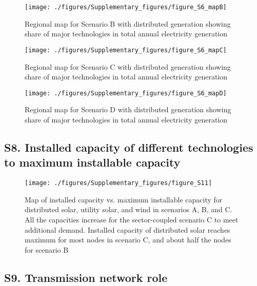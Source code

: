 \begin{figure}[H]
\renewcommand*{\thefigure}{S\arabic{figure}}

\texttt{[image: ./figures/Supplementary\_figures/figure\_S6\_mapB]}
\caption{Regional map for Scenario B with distributed generation showing share of major technologies in total annual electricity generation}
\end{figure}

\begin{figure}[H]
\renewcommand*{\thefigure}{S\arabic{figure}}

\texttt{[image: ./figures/Supplementary\_figures/figure\_S6\_mapC]}
\caption{Regional map for Scenario C with distributed generation showing share of major technologies in total annual electricity generation}
\end{figure}

\begin{figure}[H]
\renewcommand*{\thefigure}{S\arabic{figure}}

\texttt{[image: ./figures/Supplementary\_figures/figure\_S6\_mapD]}
\caption{Regional map for Scenario D with distributed generation showing share of major technologies in total annual electricity generation}
\end{figure}

\subsection*{S8. Installed capacity of different technologies to maximum installable capacity}

\begin{figure}[H]
\renewcommand*{\thefigure}{S\arabic{figure}}

\texttt{[image: ./figures/Supplementary\_figures/figure\_S11]}
\caption{Map of installed capacity vs. maximum installable capacity for distributed solar, utility solar, and wind in scenarios A, B, and C. All the capacities increase for the sector-coupled scenario C to meet additional demand. Installed capacity of distributed solar reaches maximum for most nodes in scenario C, and about half the nodes for scenario B}
\end{figure}

\subsection*{S9. Transmission network role}

